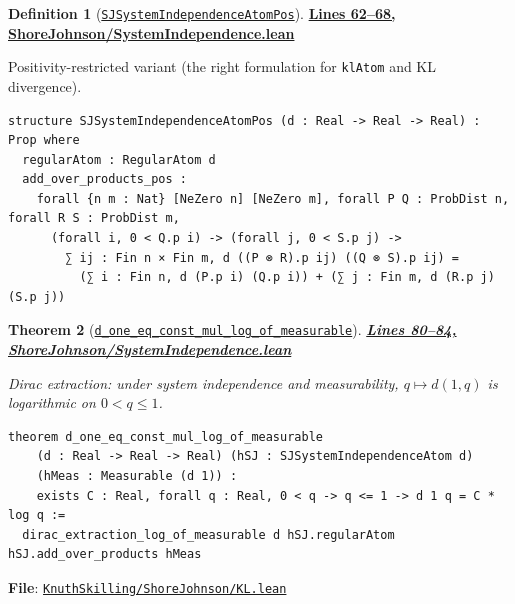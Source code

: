 \documentclass[11pt]{article}
\newtheorem{theorem}{Theorem}[section]
\theoremstyle{definition}
\newtheorem{definition}[theorem]{Definition}
\theoremstyle{remark}
\begin{document}
\begin{definition}[\href{https://github.com/zariuq/ks-foundations-of-inference/blob/main/KnuthSkilling/ShoreJohnson/SystemIndependence.lean\#L62}{\texttt{SJSystemIndependenceAtomPos}}]
\textbf{\href{https://github.com/zariuq/ks-foundations-of-inference/blob/main/KnuthSkilling/ShoreJohnson/SystemIndependence.lean\#L62-L68}{Lines 62--68, ShoreJohnson/SystemIndependence.lean}}

Positivity-restricted variant (the right formulation for \texttt{klAtom} and KL divergence).
\end{definition}

\begin{lstlisting}[caption={System independence with positivity hypotheses on references}]
structure SJSystemIndependenceAtomPos (d : Real -> Real -> Real) : Prop where
  regularAtom : RegularAtom d
  add_over_products_pos :
    forall {n m : Nat} [NeZero n] [NeZero m], forall P Q : ProbDist n, forall R S : ProbDist m,
      (forall i, 0 < Q.p i) -> (forall j, 0 < S.p j) ->
        ∑ ij : Fin n × Fin m, d ((P ⊗ R).p ij) ((Q ⊗ S).p ij) =
          (∑ i : Fin n, d (P.p i) (Q.p i)) + (∑ j : Fin m, d (R.p j) (S.p j))
\end{lstlisting}

\begin{theorem}[\href{https://github.com/zariuq/ks-foundations-of-inference/blob/main/KnuthSkilling/ShoreJohnson/SystemIndependence.lean\#L80}{\texttt{d\_one\_eq\_const\_mul\_log\_of\_measurable}}]
\textbf{\href{https://github.com/zariuq/ks-foundations-of-inference/blob/main/KnuthSkilling/ShoreJohnson/SystemIndependence.lean\#L80-L84}{Lines 80--84, ShoreJohnson/SystemIndependence.lean}}

Dirac extraction: under system independence and measurability, $q \mapsto d(1,q)$ is logarithmic on $0<q\le 1$.
\end{theorem}

\begin{lstlisting}[caption={Dirac extraction: Cauchy -> log under measurability}]
theorem d_one_eq_const_mul_log_of_measurable
    (d : Real -> Real -> Real) (hSJ : SJSystemIndependenceAtom d)
    (hMeas : Measurable (d 1)) :
    exists C : Real, forall q : Real, 0 < q -> q <= 1 -> d 1 q = C * log q :=
  dirac_extraction_log_of_measurable d hSJ.regularAtom hSJ.add_over_products hMeas
\end{lstlisting}

\textbf{File}: \href{https://github.com/zariuq/ks-foundations-of-inference/blob/main/KnuthSkilling/ShoreJohnson/KL.lean}{\texttt{KnuthSkilling/ShoreJohnson/KL.lean}}
\end{document}
